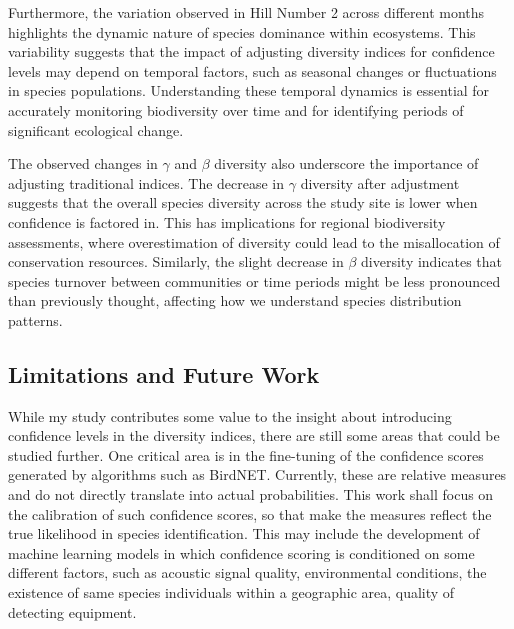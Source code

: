 \documentclass[a4paper,12pt]{article}
\begin{document}
Furthermore, the variation observed in Hill Number 2 across different months highlights the dynamic nature of species dominance within ecosystems. This variability suggests that the impact of adjusting diversity indices for confidence levels may depend on temporal factors, such as seasonal changes or fluctuations in species populations. Understanding these temporal dynamics is essential for accurately monitoring biodiversity over time and for identifying periods of significant ecological change.

The observed changes in $\gamma$ and $\beta$ diversity also underscore the importance of adjusting traditional indices. The decrease in $\gamma$ diversity after adjustment suggests that the overall species diversity across the study site is lower when confidence is factored in. This has implications for regional biodiversity assessments, where overestimation of diversity could lead to the misallocation of conservation resources. Similarly, the slight decrease in $\beta$ diversity indicates that species turnover between communities or time periods might be less pronounced than previously thought, affecting how we understand species distribution patterns.


\subsection{Limitations and Future Work}
While my study contributes some value to the insight about introducing confidence levels in the diversity indices, there are still some areas that could be studied further. One critical area is in the fine-tuning of the confidence scores generated by algorithms such as BirdNET. Currently, these are relative measures and do not directly translate into actual probabilities. This work shall focus on the calibration of such confidence scores, so that make the measures reflect the true likelihood in species identification. This may include the development of machine learning models in which confidence scoring is conditioned on some different factors, such as acoustic signal quality, environmental conditions, the existence of same species individuals within a geographic area, quality of detecting equipment.
\end{document}
